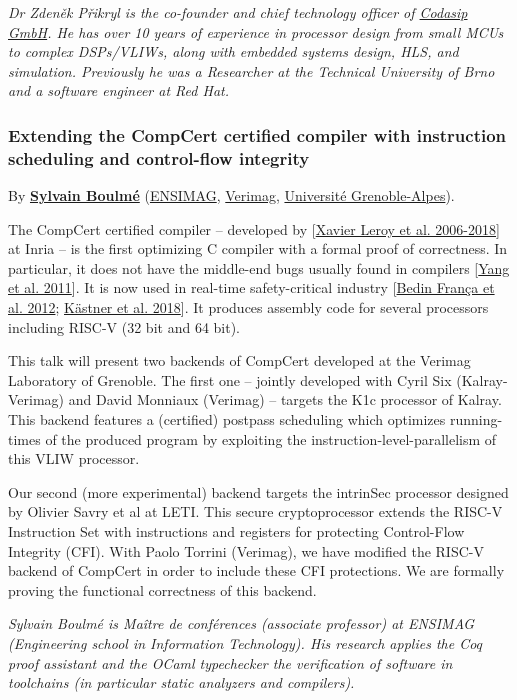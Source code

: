 \documentclass[a4paper, 10pt]{article}
\begin{document}
{\emph{\footnotesize Dr Zdeněk Přikryl is the co-founder and chief technology officer of \href{http://www.codasip.com}{Codasip GmbH}. He has over 10 years of experience in processor design from small MCUs to complex DSPs/VLIWs, along with embedded systems design, HLS, and simulation. Previously he was a Researcher at the Technical University of Brno and a software engineer at Red Hat.}

\subsubsection{Extending the CompCert certified compiler with instruction scheduling and control-flow integrity}
\label{sec:org5484e0d}
By \textbf{\href{http://www-verimag.imag.fr/\~boulme}{Sylvain Boulmé}}
(\href{http://ensimag.grenoble-inp.fr}{ENSIMAG},
\href{http://www-verimag.imag.fr}{Verimag},
\href{https://www.univ-grenoble-alpes.fr}{Université Grenoble-Alpes}).

The CompCert certified compiler -- developed by [\href{http://compcert.inria.fr/}{Xavier Leroy et al.
2006-2018}] at Inria -- is the first optimizing C compiler with a
formal proof of correctness. In particular, it does not have the
middle-end bugs usually found in compilers [\href{http://doi.acm.org/10.1145/1993498.1993532}{Yang et al. 2011}]. It is
now used in real-time safety-critical industry [\href{http://hal.inria.fr/hal-00653367}{Bedin França et
al. 2012}; \href{http://hal.inria.fr/hal-01643290}{Kästner et al. 2018}]. It produces assembly code for several
processors including RISC-V (32 bit and 64 bit).

This talk will present two backends of CompCert developed at the Verimag
Laboratory of Grenoble. The first one -- jointly developed with Cyril
Six (Kalray-Verimag) and David Monniaux (Verimag) -- targets the K1c
processor of Kalray. This backend features a (certified) postpass
scheduling which optimizes running-times of the produced program by
exploiting the instruction-level-parallelism of this VLIW processor.

Our second (more experimental) backend targets the intrinSec processor
designed by Olivier Savry et al at LETI. This secure cryptoprocessor
extends the RISC-V Instruction Set with instructions and registers for
protecting Control-Flow Integrity (CFI). With Paolo Torrini (Verimag),
we have modified the RISC-V backend of CompCert in order to include
these CFI protections. We are formally proving the functional
correctness of this backend.

\emph{\footnotesize Sylvain Boulmé is Maître de conférences (associate professor) at ENSIMAG (Engineering school in Information Technology). His research applies the Coq proof assistant and the OCaml typechecker the verification of software in toolchains (in particular static analyzers and compilers).}

}
\end{document}
